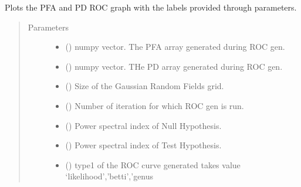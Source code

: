 \documentclass[letterpaper,10pt,english]{sphinxmanual}
\begin{document}
\begin{fulllineitems}
\label{\detokenize{utilities:utilities.plotROC}}
\sphinxAtStartPar
Plots the PFA and PD ROC graph with the labels provided through parameters.
\begin{quote}\begin{description}
\item[{Parameters}] \leavevmode\begin{itemize}
\item {} 
\sphinxAtStartPar
{} () \textendash{} numpy vector. The PFA array generated during ROC gen.

\item {} 
\sphinxAtStartPar
{} () \textendash{} numpy vector. THe PD array generated during ROC gen.

\item {} 
\sphinxAtStartPar
{} () \textendash{} Size of the Gaussian Random Fields grid.

\item {} 
\sphinxAtStartPar
{} () \textendash{} Number of iteration for which ROC gen is run.

\item {} 
\sphinxAtStartPar
{} () \textendash{} Power spectral index of Null Hypothesis.

\item {} 
\sphinxAtStartPar
{} () \textendash{} Power spectral index of Test Hypothesis.

\item {} 
\sphinxAtStartPar
{} () \textendash{} type1 of the ROC curve generated takes value ‘likelihood’,’betti’,’genus


\end{itemize}
\end{description}
\end{quote}
\end{fulllineitems}
\end{document}
